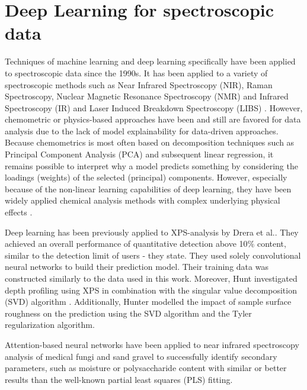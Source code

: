 \label{DL_theory}
\section{Deep Learning for spectroscopic data}

Techniques of machine learning and deep learning specifically have been applied to spectroscopic data since the 1990s. It has been applied to a variety of spectroscopic methods such as Near Infrared Spectroscopy (NIR), Raman Spectroscopy, Nuclear Magnetic Resonance Spectroscopy (NMR) and Infrared Spectroscopy (IR) and Laser Induced Breakdown Spectroscopy (LIBS) \cite{krohling_1d_2023, sun_cnnlstm_2023, ma_conditional_2022, zhang_deep_2023, castorena_deep_2021, ghosh_deep_2019, huang_attention_2019}. However, chemometric or physics-based approaches have been and still are favored for data analysis due to the lack of model explainability for data-driven approaches. Because chemometrics is most often based on decomposition techniques such as Principal Component Analysis (PCA) and subsequent linear regression, it remains possible to interpret why a model predicts something by considering the loadings (weights) of the selected (principal) components. However, especially because of the non-linear learning capabilities of deep learning, they have been widely applied chemical analysis methods with complex underlying physical effects \cite{aires-de-sousa_prediction_2002}.

Deep learning has been previously applied to XPS-analysis by Drera et al.\cite{drera_deep_2019}. They achieved an overall performance of quantitative detection above 10$\%$ content, similar to the detection limit of users - they state. They used solely convolutional neural networks to build their prediction model. Their training data was constructed similarly to the data used in this work. Moreover, Hunt investigated depth profiling using XPS in combination with the singular value decomposition (SVD) algorithm \cite{hunt_depth_2000}. Additionally, Hunter modelled the impact of sample surface roughness on the prediction using the SVD algorithm and the Tyler regularization algorithm.

Attention-based neural networks have been applied to near infrared spectroscopy analysis of medical fungi \cite{huang_attention_2019} and sand gravel \cite{yuan_hybrid_2022} to successfully identify secondary parameters, such as moisture or polysaccharide content with similar or better results than the well-known partial least squares (PLS) fitting.

